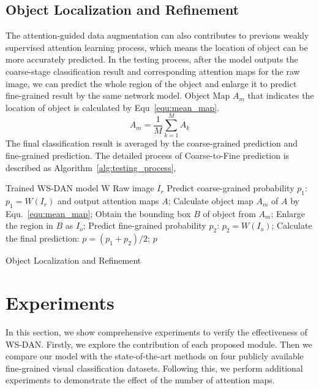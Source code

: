 \documentclass[10pt,twocolumn,letterpaper]{article}
\begin{document}
\subsection{Object Localization and Refinement}
The attention-guided data augmentation can also contributes to previous weakly supervised attention learning process, which means the location of object can be more accurately predicted. In the testing process, after the model outputs the coarse-stage classification result and corresponding attention maps for the raw image, we can predict the whole region of the object and enlarge it to predict fine-grained result by the same network model. Object Map $A_m$ that indicates the location of object is calculated by Equ~\ref{equ:mean_map}.
\begin{equation}
A_m = \dfrac{1}{M} \sum_{k=1}^{M} A_k
\label{equ:mean_map}
\end{equation}
The final classification result is averaged by the coarse-grained prediction and fine-grained prediction. The detailed process of Coarse-to-Fine prediction is described as Algorithm~\ref{alg:testing_process},
\begin{algorithm}[h]
    \begin{algorithmic}[1]
        \REQUIRE Trained WS-DAN model W
        \REQUIRE Raw image $I_r$
        \STATE Predict coarse-grained probability $p_1$: $p_1 = W(I_r)$ and output attention maps $A$;
        \STATE Calculate object map $A_m$ of $A$ by Equ.~\ref{equ:mean_map};
        \STATE Obtain the bounding box $B$ of object from $A_m$;
        \STATE Enlarge the region in $B$ as $I_o$;
        \STATE Predict fine-grained probability $p_2$:  $p_2 = W(I_o)$;
        \STATE Calculate the final prediction: $p = (p_1 + p_2) / 2$;
        \RETURN $p$
    \end{algorithmic}
    \caption{Object Localization and Refinement}
    \label{alg:testing_process}
\end{algorithm}

\section{Experiments}
\label{sec:experiments}
In this section, we show comprehensive experiments to verify the effectiveness of WS-DAN. Firstly, we explore the contribution of each proposed module. Then we compare our model with the state-of-the-art methods on four publicly available fine-grained visual classification datasets. Following this, we perform additional experiments to demonstrate the effect of the number of attention maps.
\end{document}
